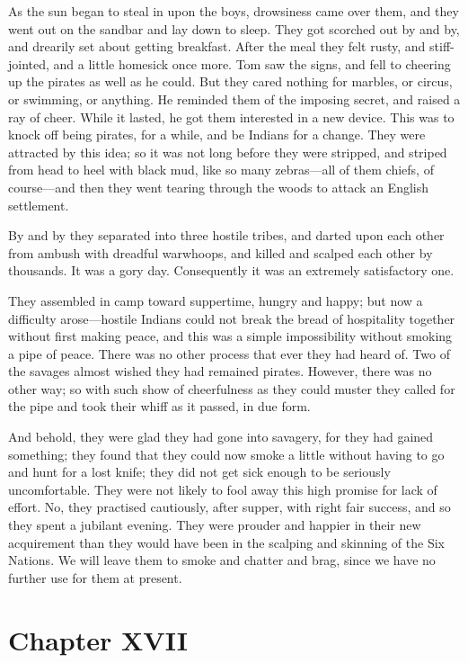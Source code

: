 \documentclass{book}
\begin{document}
As the sun began to steal in upon the boys, drowsiness came over them, and they went out on the sandbar and lay down to sleep. They got scorched out by and by, and drearily set about getting breakfast. After the meal they felt rusty, and stiff-jointed, and a little homesick once more. Tom saw the signs, and fell to cheering up the pirates as well as he could. But they cared nothing for marbles, or circus, or swimming, or anything. He reminded them of the imposing secret, and raised a ray of cheer. While it lasted, he got them interested in a new device. This was to knock off being pirates, for a while, and be Indians for a change. They were attracted by this idea; so it was not long before they were stripped, and striped from head to heel with black mud, like so many zebras—all of them chiefs, of course—and then they went tearing through the woods to attack an English settlement.

By and by they separated into three hostile tribes, and darted upon each other from ambush with dreadful warwhoops, and killed and scalped each other by thousands. It was a gory day. Consequently it was an extremely satisfactory one.

They assembled in camp toward suppertime, hungry and happy; but now a difficulty arose—hostile Indians could not break the bread of hospitality together without first making peace, and this was a simple impossibility without smoking a pipe of peace. There was no other process that ever they had heard of. Two of the savages almost wished they had remained pirates. However, there was no other way; so with such show of cheerfulness as they could muster they called for the pipe and took their whiff as it passed, in due form.

And behold, they were glad they had gone into savagery, for they had gained something; they found that they could now smoke a little without having to go and hunt for a lost knife; they did not get sick enough to be seriously uncomfortable. They were not likely to fool away this high promise for lack of effort. No, they practised cautiously, after supper, with right fair success, and so they spent a jubilant evening. They were prouder and happier in their new acquirement than they would have been in the scalping and skinning of the Six Nations. We will leave them to smoke and chatter and brag, since we have no further use for them at present.

\chapter*{Chapter XVII}
\end{document}

